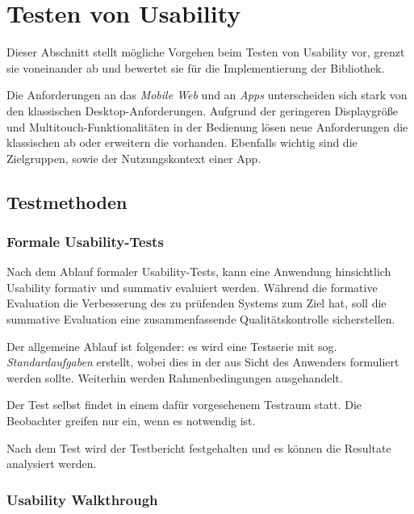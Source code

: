 \section{Testen von Usability}
\label{usability_testing}

Dieser Abschnitt stellt mögliche Vorgehen beim Testen von Usability vor, grenzt sie voneinander ab und bewertet sie für die Implementierung der Bibliothek. 

Die Anforderungen an das \textit{Mobile Web} und an \textit{Apps} unterscheiden sich stark von den klassischen Desktop-Anforderungen. 
Aufgrund der geringeren Displaygröße und Multitouch-Funktionalitäten in der Bedienung lösen neue Anforderungen die klassischen ab oder erweitern die vorhanden. 
Ebenfalls wichtig sind die Zielgruppen, sowie der Nutzungskontext einer App. 

\subsection{Testmethoden \label{sec:testmethoden}}

\subsubsection{Formale Usability-Tests \label{sec:formal-usability-test}}

Nach dem Ablauf formaler Usability-Tests, kann eine Anwendung hinsichtlich Usability formativ und summativ evaluiert werden. 
Während die formative Evaluation die Verbesserung des zu prüfenden Systems zum Ziel hat, soll die summative Evaluation eine zusammenfassende Qualitätskontrolle sicherstellen. 

Der allgemeine Ablauf ist folgender: es wird eine Testserie mit sog. \textit{Standardaufgaben} erstellt, wobei dies in der aus Sicht des Anwenders formuliert werden sollte. 
Weiterhin werden Rahmenbedingungen ausgehandelt. 

Der Test selbst findet in einem dafür vorgesehenem Testraum statt. 
Die Beobachter greifen nur ein, wenn es notwendig ist. 

Nach dem Test wird der Testbericht festgehalten und es können die Resultate analysiert werden. 

\subsubsection{Usability Walkthrough}

